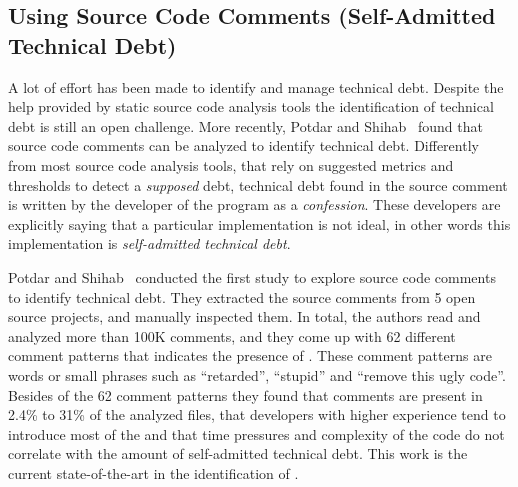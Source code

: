 

\subsection{Using Source Code Comments (Self-Admitted Technical Debt)}

A lot of effort has been made to identify and manage technical debt. Despite the help provided by static source code analysis tools the identification of technical debt is still an open challenge. More recently, Potdar and Shihab~\cite{Potdar2014ICSME} found that source code comments can be analyzed to identify technical debt. Differently from most source code analysis tools, that rely on suggested metrics and thresholds to detect a \emph{supposed} debt, technical debt found in the source comment is written by the developer of the program as a \emph{confession}. These developers are explicitly saying that a particular implementation is not ideal, in other words this implementation is \emph{self-admitted technical debt}. 

Potdar and Shihab~\cite{Potdar2014ICSME} conducted the first study to explore source code comments to identify technical debt. They extracted the source comments from 5 open source projects, and manually inspected them. In total, the authors read and analyzed more than 100K comments, and they come up with 62 different comment patterns that indicates the presence of \SATD. These comment patterns are words or small phrases such as ``retarded'', ``stupid'' and ``remove this ugly code''. Besides of the 62 comment patterns they found that \SATD comments are present in 2.4\% to 31\% of the analyzed files, that developers with higher experience tend to introduce most of the \SATD and that time pressures and complexity of the code do not correlate with the amount of self-admitted technical debt. This work is the current state-of-the-art in the identification of \SATD. 

